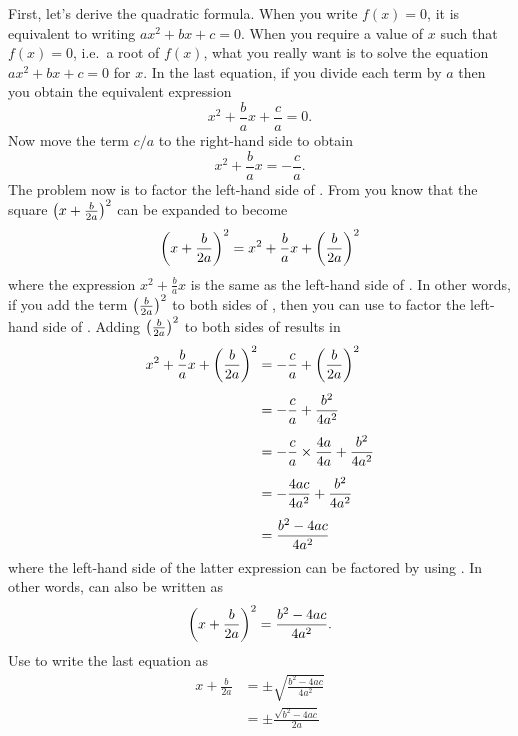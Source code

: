 \documentclass[a4paper,oneside,12pt]{article}
\begin{document}
First, let's derive the quadratic formula.  When you write $f(x) = 0$,
it is equivalent to writing $ax^2 + bx + c = 0$.  When you require a
value of $x$ such that $f(x) = 0$, i.e.~a root of $f(x)$, what you
really want is to solve the equation $ax^2 + bx + c = 0$ for $x$.  In
the last equation, if you divide each term by $a$ then you obtain the
equivalent expression
\[
x^2 + \frac{b}{a} x + \frac{c}{a}
=
0.
\]
Now move the term $c/a$ to the right-hand side to obtain
\begin{equation}
\label{eqn:quadratic_formula_factor_LHS}
x^2 + \frac{b}{a} x
=
-\frac{c}{a}.
\end{equation}
The problem now is to factor the left-hand side of
.  From
 you know that the square
$\parenthesis*{x + \frac{b}{2a}}^2$ can be expanded to become
\[
\parenthesis*{x + \frac{b}{2a}}^2
=
x^2 + \frac{b}{a} x + \parenthesis*{\frac{b}{2a}}^2
\]
where the expression $x^2 + \frac{b}{a} x$ is the same as the
left-hand side of .
In other words, if you add the term $\parenthesis*{\frac{b}{2a}}^2$ to
both sides of , then you
can use  to factor the left-hand
side of .  Adding
$\parenthesis*{\frac{b}{2a}}^2$ to both sides of
 results in
\begin{align*}
x^2 + \frac{b}{a} x + \parenthesis*{\frac{b}{2a}}^2
&=
-\frac{c}{a} + \parenthesis*{\frac{b}{2a}}^2 \\[4pt]
&=
-\frac{c}{a} + \frac{b^2}{4a^2} \\[4pt]
&=
-\frac{c}{a} \times \frac{4a}{4a} + \frac{b^2}{4a^2} \\[4pt]
&=
-\frac{4ac}{4a^2} + \frac{b^2}{4a^2} \\[4pt]
&=
\frac{
  b^2 - 4ac
}{
  4a^2
}
\end{align*}
where the left-hand side of the latter expression can be factored by
using .  In other words,
 can also be written as
\[
\parenthesis*{x + \frac{b}{2a}}^2
=
\frac{
  b^2 - 4ac
}{
  4a^2
}.
\]
Use  to write the
last equation as
\begin{equation}
\label{eqn:quadratic_formula_completing_square_solve_for_x}
\begin{aligned}
x + \frac{b}{2a}
&=
\pm
\sqrt{
  \frac{
    b^2 - 4ac
  }{
    4a^2
  }
} \\[4pt]
&=
\pm
\frac{
  \sqrt{b^2 - 4ac}
}{
  2a
}
\end{aligned}
\end{equation}
\end{document}
